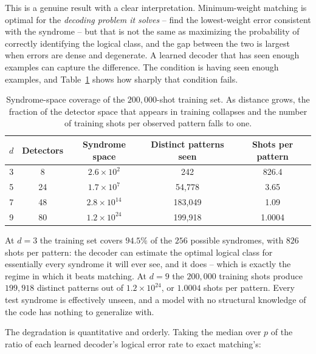 \documentclass[Thesis.tex]{subfiles}
\begin{document}
This is a genuine result with a clear interpretation. Minimum-weight matching is
optimal for the \emph{decoding problem it solves} -- find the lowest-weight error
consistent with the syndrome -- but that is not the same as maximizing the
probability of correctly identifying the logical class, and the gap between the two
is largest when errors are dense and degenerate. A learned decoder that has seen
enough examples can capture the difference. The condition is having seen enough
examples, and Table~\ref{tab:ch6_coverage} shows how sharply that condition fails.

\begin{table}[htbp]
\centering
\caption[Syndrome-space coverage of the training set]{Syndrome-space coverage of the $200{,}000$-shot training set. As distance
grows, the fraction of the detector space that appears in training collapses and the
number of training shots per observed pattern falls to one.}
\label{tab:ch6_coverage}
\small
\begin{tabular}{ccccc}
\toprule
\textbf{$d$} & \textbf{Detectors} & \textbf{Syndrome space}
& \textbf{Distinct patterns seen} & \textbf{Shots per pattern} \\
\midrule
3 & 8  & $2.6 \times 10^{2}$  & 242     & 826.4 \\
5 & 24 & $1.7 \times 10^{7}$  & 54{,}778  & 3.65 \\
7 & 48 & $2.8 \times 10^{14}$ & 183{,}049 & 1.09 \\
9 & 80 & $1.2 \times 10^{24}$ & 199{,}918 & 1.0004 \\
\bottomrule
\end{tabular}
\end{table}

At $d = 3$ the training set covers $94.5\%$ of the $256$ possible syndromes, with
$826$ shots per pattern: the decoder can estimate the optimal logical class for
essentially every syndrome it will ever see, and it does -- which is exactly the
regime in which it beats matching. At $d = 9$ the $200{,}000$ training shots produce
$199{,}918$ distinct patterns out of $1.2 \times 10^{24}$, or $1.0004$ shots per
pattern. Every test syndrome is effectively unseen, and a model with no structural
knowledge of the code has nothing to generalize with.

The degradation is quantitative and orderly. Taking the median over $p$ of the ratio
of each learned decoder's logical error rate to exact matching's:
\end{document}

